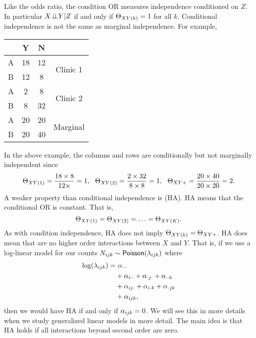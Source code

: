 Like the odds ratio, the condition OR measures independence conditioned on $Z$. In particular $X {\perp\!\!\!\perp} Y|Z$ if and only if ${\Theta}_{XY(k)}=1$ for all $k$. Conditional independence is not the same as marginal independence. For example,
\begin{center}
    \begin{tabular}{c|cc|c}
        &Y&N\\
        \hline 
        A&18&12&\multirow{2}{3.5em}{Clinic 1}\\
        B&12&8\\
        \hline 
        A&2&8&\multirow{2}{3.5em}{Clinic 2}\\
        B&8&32\\
        \hline
        A&20&20&\multirow{2}{3.5em}{Marginal}\\
        B&20&40\\
    \end{tabular}
\end{center}
In the above example, the columns and rows are conditionally but not marginally independent since
\[{\Theta}_{XY(1)} = \frac{18\times 8}{12\times }=1,~~{\Theta}_{XY(2)} = \frac{2\times 32}{8\times 8}=1,~~ {\Theta}_{XY+}= \frac{20\times 40}{20\times 20}=2. \]
A weaker property than conditional independence is  (HA). HA means that the conditional OR is constant. That is,
\[{\Theta}_{XY(1)}={\Theta}_{XY(2)} =\ldots = {\Theta}_{XY(K)}.\]
As with condition independence,  HA does not imply ${\Theta}_{XY(k)}= {\Theta}_{XY+}$. HA does mean that are no higher order interactions between $X$ and $Y$. That is, if we use a log-linear model for our counts $N_{ijk} \sim \mathsf{Poisson}(\lambda_{ijk})$ where
\begin{align*}
    \log(\lambda_{ijk}) =&~ {\alpha}_{\cdot\cdot\cdot}\\
    &+{\alpha}_{i\cdot\cdot}+{\alpha}_{\cdot j \cdot} + {\alpha}_{\cdot\cdot k}\\
    &+{\alpha}_{ij\cdot} + {\alpha}_{i\cdot k}+{\alpha}_{\cdot jk}\\
    &+{\alpha}_{ijk},
\end{align*}
then we would have HA if and only if ${\alpha}_{ijk} =0$. We will see this in more details when we study generalized linear models in more detail. The main idea is that HA holds if all interactions beyond second order are zero.
